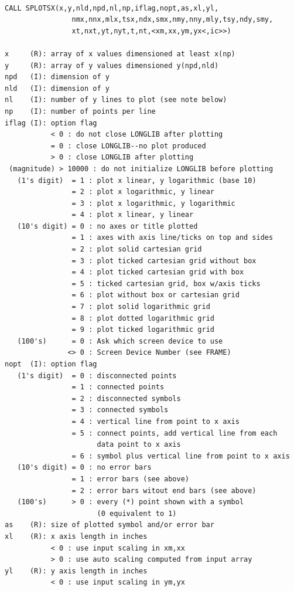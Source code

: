 \documentclass[11pt]{report}
\begin{document}
\begin{verbatim}

CALL SPLOTSX(x,y,nld,npd,nl,np,iflag,nopt,as,xl,yl,
                nmx,nnx,mlx,tsx,ndx,smx,nmy,nny,mly,tsy,ndy,smy,
                xt,nxt,yt,nyt,t,nt,<xm,xx,ym,yx<,ic>>)

x     (R): array of x values dimensioned at least x(np)
y     (R): array of y values dimensioned y(npd,nld)
npd   (I): dimension of y
nld   (I): dimension of y
nl    (I): number of y lines to plot (see note below)
np    (I): number of points per line
iflag (I): option flag
           < 0 : do not close LONGLIB after plotting
           = 0 : close LONGLIB--no plot produced
           > 0 : close LONGLIB after plotting
 (magnitude) > 10000 : do not initialize LONGLIB before plotting
   (1's digit)  = 1 : plot x linear, y logarithmic (base 10)
                = 2 : plot x logarithmic, y linear
                = 3 : plot x logarithmic, y logarithmic
                = 4 : plot x linear, y linear
   (10's digit) = 0 : no axes or title plotted
                = 1 : axes with axis line/ticks on top and sides
                = 2 : plot solid cartesian grid
                = 3 : plot ticked cartesian grid without box
                = 4 : plot ticked cartesian grid with box
                = 5 : ticked cartesian grid, box w/axis ticks
                = 6 : plot without box or cartesian grid
                = 7 : plot solid logarithmic grid
                = 8 : plot dotted logarithmic grid
                = 9 : plot ticked logarithmic grid
   (100's)      = 0 : Ask which screen device to use
               <> 0 : Screen Device Number (see FRAME)
nopt  (I): option flag
   (1's digit)  = 0 : disconnected points
                = 1 : connected points
                = 2 : disconnected symbols
                = 3 : connected symbols
                = 4 : vertical line from point to x axis
                = 5 : connect points, add vertical line from each
                      data point to x axis
                = 6 : symbol plus vertical line from point to x axis
   (10's digit) = 0 : no error bars
                = 1 : error bars (see above)
                = 2 : error bars witout end bars (see above)
   (100's)      > 0 : every (*) point shown with a symbol
                      (0 equivalent to 1)
as    (R): size of plotted symbol and/or error bar
xl    (R): x axis length in inches
           < 0 : use input scaling in xm,xx
           > 0 : use auto scaling computed from input array
yl    (R): y axis length in inches
           < 0 : use input scaling in ym,yx

\end{verbatim}
\end{document}
